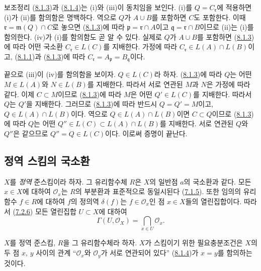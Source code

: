 보조정리 (\hyperref[I.8.1.3-ko]{8.1.3})과
(\hyperref[I.8.1.4-ko]{8.1.4})는 (i)와 (iii)이 동치임을 보인다.
(i)를 $Q=C_\mathfrak r$에 적용하면 (i)가 (ii)를 함의함은 명백하다.
역으로 $Q$가 $A\cup B$를 포함하면 $C$도 포함한다. 이때
$\mathfrak r=\mathfrak m(Q)\cap C$로 놓으면
(\hyperref[I.8.1.3-ko]{8.1.3})에 따라
$\mathfrak p=\mathfrak r\cap A$이고 $\mathfrak q=\mathfrak r\cap B$이므로
(ii)는 (i)를 함의한다. (iv)가 (i)를 함의함도 곧 알 수 있다. 실제로
$Q$가 $A\cup B$를 포함하면 (\hyperref[I.8.1.3-ko]{8.1.3})에 따라
어떤 국소환 $C_\mathfrak r\in L(C)$를 지배한다. 가정에 따라
$C_\mathfrak r\in L(A)\cap L(B)$이고,
(\hyperref[I.8.1.1-ko]{8.1.1})과
(\hyperref[I.8.1.3-ko]{8.1.3})에 따라
$C_\mathfrak r=A_\mathfrak p=B_\mathfrak q$이다.

끝으로 (iii)이 (iv)를 함의함을 보이자. $Q\in L(C)$라 하자.
(\hyperref[I.8.1.3-ko]{8.1.3})에 따라 $Q$는 어떤 $M\in L(A)$와
$N\in L(B)$를 지배한다. 따라서 서로 연관된 $M$과 $N$은 가정에 따라
같다. 이제 $C\subset M$이므로 (\hyperref[I.8.1.3-ko]{8.1.3})에 따라
$M$은 어떤 $Q'\in L(C)$를 지배한다. 따라서 $Q$는 $Q'$을 지배한다.
그러므로 (\hyperref[I.8.1.3-ko]{8.1.3})에 따라 반드시
$Q=Q'=M$이고, $Q\in L(A)\cap L(B)$이다. 역으로
$Q\in L(A)\cap L(B)$이면 $C\subset Q$이므로
(\hyperref[I.8.1.3-ko]{8.1.3})에 따라 $Q$는 어떤
$Q''\in L(C)\subset L(A)\cap L(B)$를 지배한다. 서로 연관된 $Q$와
$Q''$은 같으므로 $Q''=Q\in L(C)$이다. 이로써 증명이 끝난다.

\subsection{정역 스킴의 국소환}
\label{subsection:I.8.2-ko}

\begin{env}[8.2.1]
\label{I.8.2.1-ko}
$X$를 \emph{정역} 준스킴이라 하자. 그 유리함수체 $R$은 $X$의 일반점
$a$의 국소환과 같다. 모든 $x\in X$에 대하여
$\mathscr{O}_x$는 $R$의 부분환과 표준적으로 동일시된다
(\hyperref[I.7.1.5-ko]{7.1.5}). 또한 임의의 유리함수 $f\in R$에
대하여 $f$의 정의역 $\delta(f)$는 $f\in\mathscr{O}_x$인 점
$x\in X$들의 열린집합이다. 따라서
(\hyperref[I.7.2.6-ko]{7.2.6}) 모든 열린집합 $U\subset X$에 대하여
\begin{equation}
  \Gamma(U,\mathscr{O}_X)=\bigcap_{x\in U}\mathscr{O}_x.
  \tag{8.2.1.1}\label{I.8.2.1.1-ko}
\end{equation}
\end{env}

\begin{proposition}[8.2.2]
\label{I.8.2.2-ko}
$X$를 정역 준스킴, $R$을 그 유리함수체라 하자. $X$가 스킴이기 위한
필요충분조건은 $X$의 두 점 $x$, $y$ 사이의 관계
``$\mathscr{O}_x$와 $\mathscr{O}_y$가 서로 연관되어 있다''
(\hyperref[I.8.1.4-ko]{8.1.4})가 $x=y$를 함의하는 것이다.
\end{proposition}

